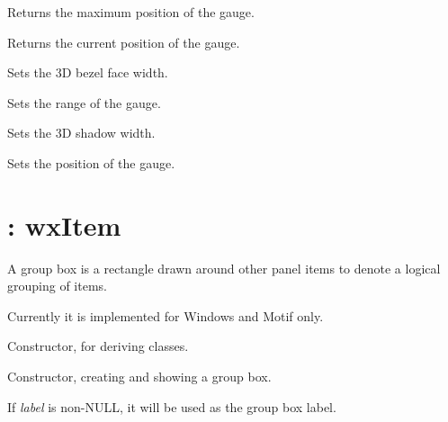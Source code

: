 Returns the maximum position of the gauge.

\label{wxgaugegetvalue}


Returns the current position of the gauge.



Sets the 3D bezel face width.

\label{wxgaugesetrange}


Sets the range of the gauge.



Sets the 3D shadow width.

\label{wxgaugesetvalue}


Sets the position of the gauge.

\section{: wxItem}\label{wxgroupbox}

A group box is a rectangle drawn around other panel items to denote
a logical grouping of items.

Currently it is implemented for Windows and Motif only.

\label{groupbox}


Constructor, for deriving classes.


Constructor, creating and showing a group box.

If {\it label} is non-NULL, it will be used as the group box label.

